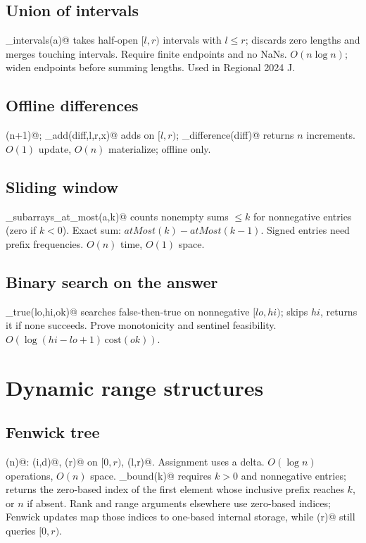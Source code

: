 \subsection{Union of intervals}
\verb@merge_intervals(a)@ takes half-open $[l,r)$ intervals with $l\le r$;
discards zero lengths and merges touching intervals. Require finite endpoints
and no NaNs. $O(n\log n)$; widen endpoints before summing lengths. Used in
Regional 2024 J.

\subsection{Offline differences}
\verb@diff(n+1)@; \verb@difference_add(diff,l,r,x)@ adds on $[l,r)$;
\verb@materialize_difference(diff)@ returns $n$ increments. $O(1)$ update,
$O(n)$ materialize; offline only.

\subsection{Sliding window}
\verb@count_subarrays_at_most(a,k)@ counts nonempty sums $\le k$ for
nonnegative entries (zero if $k<0$). Exact sum: $atMost(k)-atMost(k-1)$.
Signed entries need prefix frequencies. $O(n)$ time, $O(1)$ space.

\subsection{Binary search on the answer}
\verb@first_true(lo,hi,ok)@ searches false-then-true on nonnegative $[lo,hi)$;
skips $hi$, returns it if none succeeds. Prove monotonicity and sentinel
feasibility. $O(\log(hi-lo+1)\,\mathrm{cost}(ok))$.

\section{Dynamic range structures}
\subsection{Fenwick tree}
\verb@Fenwick(n)@: \verb@add(i,d)@, \verb@prefix(r)@ on $[0,r)$,
\verb@sum(l,r)@. Assignment uses a delta. $O(\log n)$ operations, $O(n)$
space. \verb@lower_bound(k)@ requires $k>0$ and nonnegative entries; returns
the zero-based index of the first element whose inclusive prefix reaches
$k$, or $n$ if absent. Rank and range arguments elsewhere use zero-based
indices; Fenwick updates map those indices to one-based internal storage,
while \verb@prefix(r)@ still queries $[0,r)$.

